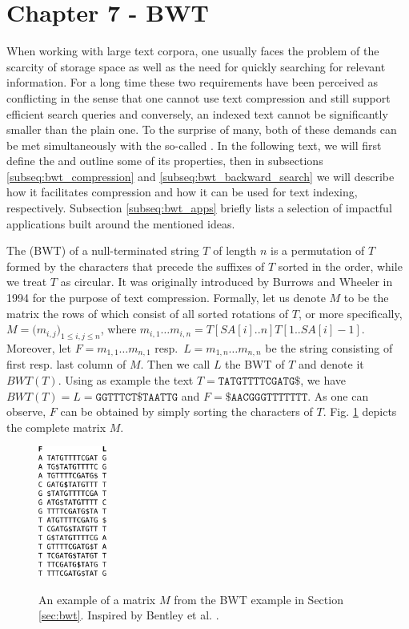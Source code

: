 \hypertarget{chapter-7---bwt}{%
\section{Chapter 7 - BWT}\label{chapter-7---bwt}}
\label{sec:bwt}
When working with large text corpora, one usually faces the problem of the scarcity of storage space as well as the need for quickly searching for relevant information. For a long time these two requirements have been perceived as conflicting in the sense that one cannot use text compression and still support efficient search queries and conversely, an indexed text cannot be significantly smaller than the plain one. To the surprise of many, both of these demands can be met simultaneously with the so-called \bwt{} \cite{burrows1994block}. In the following text, we will first define the \bwt{} and outline some of its properties, then in subsections \ref{subseq:bwt_compression} and \ref{subseq:bwt_backward_search} we will describe how it facilitates compression and how it can be used for text indexing, respectively. Subsection \ref{subseq:bwt_apps} briefly lists a selection of impactful applications built around the mentioned ideas.

The \bwt{} (BWT) of a null-terminated string $T$ of length $n$ is a permutation of $T$ formed by the characters that precede the suffixes of $T$ sorted in the \lex{} order, while we treat $T$ as circular. It was originally introduced by Burrows and Wheeler in 1994 \cite{burrows1994block} for the purpose of text compression. Formally, let us denote $M$ to be the matrix the rows of which consist of all  sorted rotations of $T$, or more specifically, $M = \big( m_{i,j} \big)_{1 \leq i, j \leq n}$, where $m_{i,1} \ldots m_{i, n} = T[SA[i]..n]T[1..SA[i]-1]$. Moreover, let $F = m_{1,1} \ldots m_{n, 1}$ resp.~$L = m_{1,n} \ldots m_{n, n}$ be the string consisting of first resp. last column of $M$. Then we call $L$ the BWT of $T$ and denote it $BWT(T)$. Using as example the text $T = \texttt{TATGTTTTCGATG\$}$, we have $BWT(T) = L = \texttt{GGTTTCT\$TAATTG}$ and $F = \texttt{\$AACGGGTTTTTTT}$. 
As one can observe, $F$ can be obtained by simply sorting the characters of $T$. Fig. \ref{fig:bwt} depicts the complete matrix $M$.

\begin{figure}[!ht]
\centering
\includegraphics[width=0.2\textwidth]{images/bwt.pdf}
\label{fig:bwt}
\caption[A BWT matrix example.]{An example of a matrix $M$ from the BWT example  in Section \ref{sec:bwt}. Inspired by Bentley et al. \cite{bentley2019complexity}.}
\end{figure}


